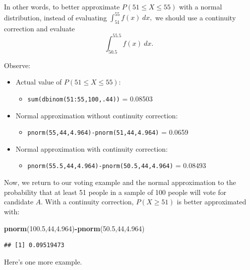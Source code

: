\documentclass[
]{book}
\newenvironment{Shaded}{\begin{snugshade}}{\end{snugshade}}
\newcommand{\DecValTok}[1]{\textcolor[rgb]{0.00,0.00,0.81}{#1}}
\newcommand{\FloatTok}[1]{\textcolor[rgb]{0.00,0.00,0.81}{#1}}
\newcommand{\FunctionTok}[1]{\textcolor[rgb]{0.13,0.29,0.53}{\textbf{#1}}}
\newcommand{\NormalTok}[1]{#1}
\newcommand{\SpecialCharTok}[1]{\textcolor[rgb]{0.81,0.36,0.00}{\textbf{#1}}}
\providecommand{\tightlist}{%
  \setlength{\itemsep}{0pt}\setlength{\parskip}{0pt}}
\theoremstyle{definition}
\theoremstyle{definition}
\theoremstyle{definition}
\theoremstyle{definition}
\theoremstyle{remark}
\begin{document}
In other words, to better approximate \(P(51\leq X \leq 55)\) with a normal distribution, instead of evaluating \(\int_{51}^{55} f(x)~dx,\) we should use a continuity correction and evaluate \[\int_{50.5}^{55.5} f(x)~dx.\]

Observe:

\begin{itemize}
\tightlist
\item
  Actual value of \(P(51\leq X \leq 55)\):

  \begin{itemize}
  \tightlist
  \item
    \texttt{sum(dbinom(51:55,100,.44))} = 0.08503
  \end{itemize}
\item
  Normal approximation without continuity correction:

  \begin{itemize}
  \tightlist
  \item
    \texttt{pnorm(55,44,4.964)-pnorm(51,44,4.964)} = 0.0659
  \end{itemize}
\item
  Normal approximation with continuity correction:

  \begin{itemize}
  \tightlist
  \item
    \texttt{pnorm(55.5,44,4.964)-pnorm(50.5,44,4.964)} = 0.08493
  \end{itemize}
\end{itemize}

Now, we return to our voting example and the normal approximation to the probability that at least 51 people in a sample of 100 people will vote for candidate \(A\). With a continuity correction, \(P(X \geq 51)\) is better approximated with:

\begin{Shaded}
\begin{Highlighting}[]
\FunctionTok{pnorm}\NormalTok{(}\FloatTok{100.5}\NormalTok{,}\DecValTok{44}\NormalTok{,}\FloatTok{4.964}\NormalTok{)}\SpecialCharTok{{-}}\FunctionTok{pnorm}\NormalTok{(}\FloatTok{50.5}\NormalTok{,}\DecValTok{44}\NormalTok{,}\FloatTok{4.964}\NormalTok{)}
\end{Highlighting}
\end{Shaded}

\begin{verbatim}
## [1] 0.09519473
\end{verbatim}

Here's one more example.
\end{document}
